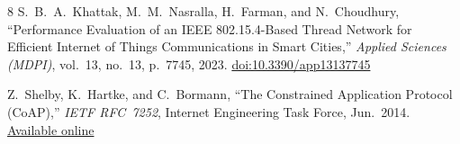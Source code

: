 \documentclass[10pt,a4paper]{article}
\begin{document}
\begin{thebibliography}{8}
S.~B.~A.~Khattak, M.~M.~Nasralla, H.~Farman, and N.~Choudhury,
``Performance Evaluation of an IEEE 802.15.4-Based Thread Network for Efficient Internet
of Things Communications in Smart Cities,''
\textit{Applied Sciences (MDPI)}, vol.~13, no.~13, p.~7745, 2023.
\newblock \href{https://doi.org/10.3390/app13137745}{doi:10.3390/app13137745}

Z.~Shelby, K.~Hartke, and C.~Bormann,
``The Constrained Application Protocol (CoAP),''
\textit{IETF RFC~7252}, Internet Engineering Task Force, Jun.\ 2014.
\newblock \href{https://www.rfc-editor.org/rfc/rfc7252}{Available online}

\end{thebibliography}
\end{document}
